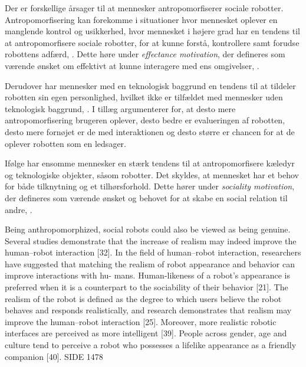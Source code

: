 Der er forskellige årsager til at mennesker antropomorfiserer sociale robotter. Antropomorfisering kan forekomme i situationer hvor mennesket oplever en manglende kontrol og usikkerhed, hvor mennesket i højere grad har en tendens til at antropomorfisere sociale robotter, for at kunne forstå, kontrollere samt forudse robottens adfærd, \parencite[s. 1478]{PDF:ExploringInfluencingVariable}. Dette høre under \textit{effectance motivation}, der defineres som værende ønsket om effektivt at kunne interagere med ens omgivelser, \parencite[s. 62]{PDF:EffectsOfAnticipatedHRI}.

Derudover har mennesker med en teknologisk baggrund en tendens til at tildeler robotten sin egen personlighed, hvilket ikke er tilfældet med mennesker uden teknologisk baggrund, \parencite[s. 19]{PDF:CloseButNotStuck}. I tillæg argumenterer \textcite[s. 2]{PDF:SharingALifeHarvey} for, at desto mere antropomorfisering brugeren oplever, desto bedre er evalueringen af robotten, desto mere fornøjet er de med interaktionen og desto større er chancen for at de oplever robotten som en ledsager.

Ifølge \textcite[s. 61]{PDF:EffectsOfAnticipatedHRI} har ensomme mennesker en stærk tendens til at antropomorfisere kæledyr og teknologiske objekter, såsom robotter. Det skyldes, at mennesket har et behov for både tilknytning og et tilhørsforhold. Dette hører under \textit{sociality motivation}, der defineres som værende ønsket og behovet for at skabe en social relation til andre, \parencite[s. 61]{PDF:EffectsOfAnticipatedHRI}.







Being anthropomorphized, social robots could also be viewed as being genuine. Several studies demonstrate that the increase of realism may indeed improve the human–robot interaction [32]. In the field of human–robot interaction, researchers have suggested that matching the realism of robot appearance and behavior can improve interactions with hu- mans. Human-likeness of a robot’s appearance is preferred when it is a counterpart to the sociability of their behavior [21]. The realism of the robot is defined as the degree to which users believe the robot behaves and responds realistically, and research demonstrates that realism may improve the human–robot interaction [25]. Moreover, more realistic robotic interfaces are perceived as more intelligent [39]. People across gender, age and culture tend to perceive a robot who possesses a lifelike appearance as a friendly companion [40]. SIDE 1478



